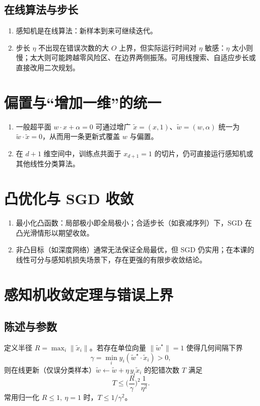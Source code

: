 \documentclass[10.5pt,hyperref,a4paper,UTF8]{ctexart}
\begin{document}
\subsection{在线算法与步长}
\begin{enumerate}
  \item 感知机是在线算法：新样本到来可继续迭代。
  \item 步长 $\eta$ 不出现在错误次数的大 $O$ 上界，但实际运行时间对 $\eta$ 敏感：$\eta$ 太小则慢；太大则可能跨越零风险区、在边界两侧振荡。可用线搜索、自适应步长或直接改用二次规划。
\end{enumerate}

\section{偏置与“增加一维”的统一}
\begin{enumerate}
  \item 一般超平面 $w\cdot x+\alpha=0$ 可通过增广 $\tilde x=(x,1)$、$\tilde w=(w,\alpha)$ 统一为 $\tilde w\cdot\tilde x=0$，从而用一条更新式覆盖 $w$ 与偏置。
  \item 在 $d{+}1$ 维空间中，训练点共面于 $x_{d+1}=1$ 的切片，仍可直接运行感知机或其他线性分类算法。
\end{enumerate}

\section{凸优化与 SGD 收敛}
\begin{enumerate}
  \item 最小化凸函数：局部极小即全局极小；合适步长（如衰减序列）下，SGD 在凸光滑情形以期望收敛。
  \item 非凸目标（如深度网络）通常无法保证全局最优，但 SGD 仍实用；在本课的线性可分与感知机损失场景下，存在更强的有限步收敛结论。
\end{enumerate}

\section{感知机收敛定理与错误上界}
\subsection{陈述与参数}
定义半径 $R=\max_i\|\tilde x_i\|$。若存在单位向量 $\|\tilde w^\star\|=1$ 使得几何间隔下界
\[
\gamma=\min_i y_i(\tilde w^\star\cdot\tilde x_i)>0,
\]
则在线更新（仅误分类样本）$\tilde w\leftarrow\tilde w+\eta\,y_i\tilde x_i$ 的犯错次数 $T$ 满足
\[
T\le\Big(\frac{R}{\gamma}\Big)^2\frac{1}{\eta^2}.
\]
常用归一化 $R\le1,\ \eta=1$ 时，$T\le 1/\gamma^2$。
\end{document}
